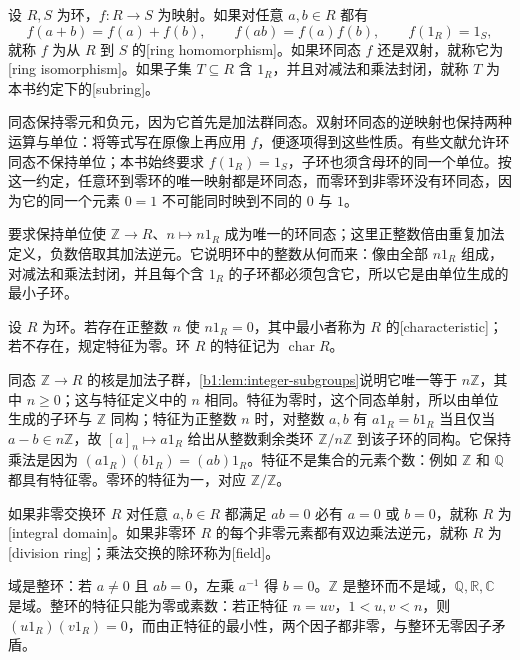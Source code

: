 \begin{definition}\label{b1:def:ring-homomorphism}
	设 \(R,S\) 为环，\(f:R\rightarrow S\) 为映射。如果对任意 \(a,b\in R\) 都有
	\[
		f(a+b)=f(a)+f(b),\qquad f(ab)=f(a)f(b),\qquad f(1_R)=1_S,
	\]
	就称 \(f\) 为从 \(R\) 到 \(S\) 的[ring homomorphism]。如果环同态 \(f\) 还是双射，就称它为[ring isomorphism]。如果子集 \(T\subseteq R\) 含 \(1_R\)，并且对减法和乘法封闭，就称 \(T\) 为本书约定下的[subring]。
\end{definition}
同态保持零元和负元，因为它首先是加法群同态。双射环同态的逆映射也保持两种运算与单位：将等式写在原像上再应用 \(f\)，便逐项得到这些性质。有些文献允许环同态不保持单位；本书始终要求 \(f(1_R)=1_S\)，子环也须含母环的同一个单位。按这一约定，任意环到零环的唯一映射都是环同态，而零环到非零环没有环同态，因为它的同一个元素 \(0=1\) 不可能同时映到不同的 \(0\) 与 \(1\)。

\ProseParagraphBreak
要求保持单位使 \(\mathbb Z\rightarrow R\)、\(n\mapsto n1_R\) 成为唯一的环同态；这里正整数倍由重复加法定义，负数倍取其加法逆元。它说明环中的整数从何而来：像由全部 \(n1_R\) 组成，对减法和乘法封闭，并且每个含 \(1_R\) 的子环都必须包含它，所以它是由单位生成的最小子环。

\begin{definition}\label{b1:def:ring-characteristic}
	设 \(R\) 为环。若存在正整数 \(n\) 使 \(n1_R=0\)，其中最小者称为 \(R\) 的[characteristic]；若不存在，规定特征为零。环 \(R\) 的特征记为 \(\operatorname{char}R\)。
\end{definition}
同态 \(\mathbb Z\rightarrow R\) 的核是加法子群，\cref{b1:lem:integer-subgroups}说明它唯一等于 \(n\mathbb Z\)，其中 \(n\geq0\)；这与特征定义中的 \(n\) 相同。特征为零时，这个同态单射，所以由单位生成的子环与 \(\mathbb Z\) 同构；特征为正整数 \(n\) 时，对整数 \(a,b\) 有 \(a1_R=b1_R\) 当且仅当 \(a-b\in n\mathbb Z\)，故 \([a]_n\mapsto a1_R\) 给出从整数剩余类环 \(\mathbb Z/n\mathbb Z\) 到该子环的同构。它保持乘法是因为 \((a1_R)(b1_R)=(ab)1_R\)。特征不是集合的元素个数：例如 \(\mathbb Z\) 和 \(\mathbb Q\) 都具有特征零。零环的特征为一，对应 \(\mathbb Z/\mathbb Z\)。

\begin{definition}\label{b1:def:domain-field}
	如果非零交换环 \(R\) 对任意 \(a,b\in R\) 都满足 \(ab=0\) 必有 \(a=0\) 或 \(b=0\)，就称 \(R\) 为[integral domain]。如果非零环 \(R\) 的每个非零元素都有双边乘法逆元，就称 \(R\) 为[division ring]；乘法交换的除环称为[field]。
\end{definition}
域是整环：若 \(a\ne0\) 且 \(ab=0\)，左乘 \(a^{-1}\) 得 \(b=0\)。\(\mathbb Z\) 是整环而不是域，\(\mathbb Q,\mathbb R,\mathbb C\) 是域。整环的特征只能为零或素数：若正特征 \(n=uv\)，\(1<u,v<n\)，则 \((u1_R)(v1_R)=0\)，而由正特征的最小性，两个因子都非零，与整环无零因子矛盾。

